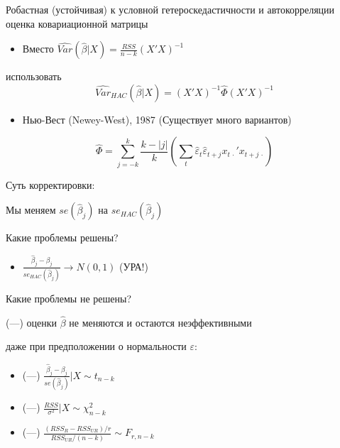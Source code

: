\documentclass[ignorenonframetext,]{beamer}
\begin{document}
\begin{frame}{Робастная (устойчивая) к условной гетероскедастичности и
автокорреляции оценка ковариационной матрицы}

\begin{itemize}
\itemsep1pt\parskip0pt
\item
  Вместо $\widehat{Var}(\hat{\beta}|X)=\frac{RSS}{n-k}(X'X)^{-1}$
\end{itemize}

использовать \[
\widehat{Var}_{HAC}(\hat{\beta}|X)=(X'X)^{-1}\hat{\Phi}(X'X)^{-1}
\]

\begin{itemize}
\itemsep1pt\parskip0pt
\item
  Нью-Вест (Newey-West), 1987 (Существует много вариантов)
\end{itemize}

\[
\hat{\Phi} = \sum_{j=-k}^k \frac{k-|j|}{k} \left(  \sum_t \hat{\varepsilon}_t\hat{\varepsilon}_{t+j} x_{t\,\cdot}'x_{t+j\,\cdot} \right)
\]

\end{frame}

\begin{frame}{Суть корректировки:}

Мы меняем $se(\hat{\beta}_j)$ на $se_{HAC}(\hat{\beta}_j)$

Какие проблемы решены?

\begin{itemize}
\itemsep1pt\parskip0pt
\item
  $\frac{\hat{\beta}_j-\beta_j}{se_{HAC}(\hat{\beta}_j)} \to N(0,1)$
  (УРА!)
\end{itemize}

\end{frame}

\begin{frame}{Какие проблемы не решены?}

(---) оценки $\hat{\beta}$ не меняются и остаются неэффективными

даже при предположении о нормальности $\varepsilon$:

\begin{itemize}
\item
  (---)
  $\frac{\hat{\beta}_j-\beta_j}{se(\hat{\beta}_j)} | X \sim t_{n-k}$
\item
  (---) $\frac{RSS}{\sigma^2} |X \sim \chi^2_{n-k}$
\item
  (---) $\frac{(RSS_R-RSS_{UR})/r}{RSS_{UR}/(n-k)} \sim F_{r,n-k}$
\end{itemize}

\end{frame}
\end{document}
